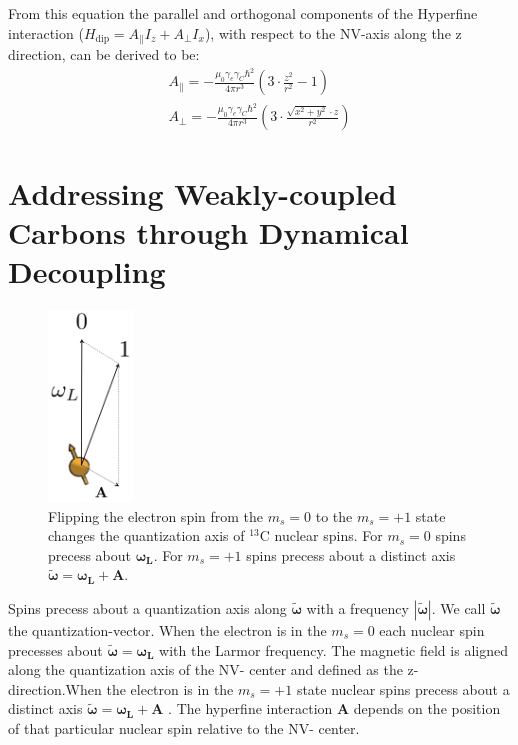 From this equation the parallel and orthogonal components of the Hyperfine interaction ($H_{\mathrm{dip}} = A_\parallel I_z + A_\perp I_x $), with respect to the NV-axis along the z direction, can be derived to be:
 \begin{eqnarray}
A_\parallel= - \frac{\mu_0 \gamma_e \gamma_C \hbar^2 }{4 \pi r^3} \left(3\cdot \frac{z^2}{r^2}-1\right)\\
 A_\perp =  -\frac{\mu_0 \gamma_e \gamma_C \hbar^2 }{4 \pi r^3}\left( 3\cdot\frac{\sqrt{x^2+y^2}\cdot z}{r^2}\right)
\end{eqnarray}

\section{Addressing Weakly-coupled Carbons through Dynamical Decoupling}
\label{controllingacarbonthroughdynamicaldecoupling}

\begin{figure}[htbp]
\centering
\includegraphics[keepaspectratio,width=0.2\textwidth,height=0.75\textheight]{./img/QuantizationAxis.png}
\caption{Flipping the electron spin from the  $m_s=0$ to the $m_s= +1$ state changes the quantization axis of $^{13}\mathrm{C}$ nuclear spins. For  $m_s=0$ spins precess about $\bm{\omega_L}$. For  $m_s=+1$ spins precess about a distinct axis $\bm{\tilde{\omega}}=\bm{\omega_L} +\bm{A}$.}
\label{fig:quantax}
\end{figure}

Spins precess about a quantization axis along $ \bm{\tilde{\omega}}$ with a frequency $|\bm{\tilde{\omega}}|$. We call $ \bm{\tilde{\omega}} $ the quantization-vector. When the electron is in the $m_s=0$ each nuclear spin precesses about $\bm{\tilde{\omega}} = \bm{\omega_L}$ with the Larmor frequency. The magnetic field is aligned along the quantization axis of the NV- center and defined as the z-direction.When the electron is in the $m_s=+1$ state nuclear spins precess about a distinct axis $\bm{\tilde{\omega}}=\bm{\omega_L} +\bm{A}$ \citep{Taminiau2012Detection}. The hyperfine interaction $\bm{A}$ depends on the position of that particular nuclear spin relative to the NV- center.

